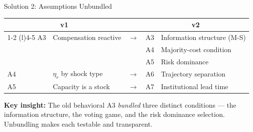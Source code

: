 \documentclass[
  ignorenonframetext,
  aspectratio=169]{beamer}
\begin{document}
\begin{frame}{Solution 2: Assumptions Unbundled}
\protect{}\label{solution-2-assumptions-unbundled}
\renewcommand{\arraystretch}{1.2}
\begin{center}
\small
\begin{tabular}{p{0.7cm} p{3.5cm} p{0.4cm} p{0.7cm} p{4.8cm}}
\toprule
\multicolumn{2}{c}{\textbf{v1}} & & \multicolumn{2}{c}{\textbf{v2}} \\
\cmidrule(r){1-2} \cmidrule(l){4-5}
A3 & Compensation reactive & $\to$ & A3 & Information structure (M-S) \\
   &                        &      & A4 & Majority-cost condition \\
   &                        &      & A5 & Risk dominance \\
\addlinespace
A4 & $\eta_r$ by shock type  & $\to$ & A6 & Trajectory separation \\
\addlinespace
A5 & Capacity is a stock    & $\to$ & A7 & Institutional lead time \\
\bottomrule
\end{tabular}
\end{center}

\vspace{0.3cm}

\textbf{Key insight:} The old behavioral A3 \emph{bundled} three
distinct conditions --- the information structure, the voting game, and
the risk dominance selection. Unbundling makes each testable and
transparent.
\end{frame}
\end{document}
